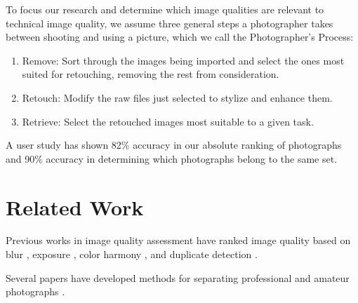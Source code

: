 \documentclass{article}
\begin{document}
To focus our research and determine which image qualities are relevant to technical image quality, we assume three general steps a photographer takes between shooting and using a picture, which we call the Photographer's Process:
\begin{enumerate}
\item Remove: Sort through the images being imported and select the ones most suited for retouching, removing the rest from consideration.
\item Retouch: Modify the raw files just selected to stylize and enhance them.
\item Retrieve: Select the retouched images most suitable to a given task.
\end{enumerate}

A user study has shown 82\% accuracy in our absolute ranking of photographs and 90\% accuracy in determining which photographs belong to the same set.

\section{Related Work}


Previous works in image quality assessment have ranked image quality based on blur \cite{springerlink:10.1007/978-3-540-77409-9_26}, exposure \cite{5540170}, color harmony \cite{COL:COL5080160410}\cite{COL:COL10004}, and duplicate detection \cite{Chu2010256}. %

Several papers have developed methods for separating professional and amateur photographs \cite{springerlink:10.1007/978-3-540-30541-5_25}\cite{springerlink:10.1007/11744078_23}\cite{1640788}\cite{springerlink:10.1007/978-3-540-88690-7_29}. %

\end{document}
